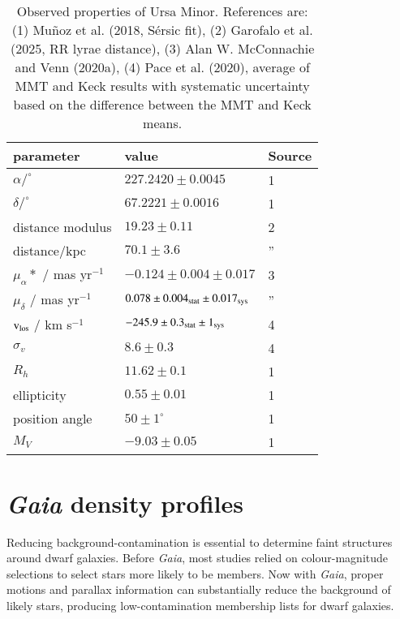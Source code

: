 \documentclass{aa}
\newcommand{\V}{{\rm v}}
\begin{document}
\begin{table}[t]
\centering
\caption[Observed Properties of Ursa Minor]{Observed properties of Ursa Minor. References are: (1) Muñoz et al. (2018, Sérsic fit), (2) Garofalo et al. (2025, RR lyrae distance), (3) Alan W. McConnachie and Venn (2020a), (4) Pace et al. (2020), average of MMT and Keck results with systematic uncertainty based on the difference between the MMT and Keck means. }
\label{tbl:umi_obs_props}
\begin{tabular}{lll}
\hline
parameter & value & Source\\
\hline
$\alpha/^\circ$ & $ 227.2420 \pm 0.0045$ & 1\\
$\delta/^\circ$ & $67.2221 \pm 0.0016$ & 1\\
distance modulus & $19.23 \pm 0.11$ & 2\\
distance/kpc & $70.1 \pm 3.6$ & ”\\
$\mu_\alpha*$ / mas yr$^{-1}$  & $-0.124 \pm 0.004 \pm 0.017$ & 3\\
$\mu_\delta$ / mas yr$^{-1}$  & $0.078 \pm 0.004_{\rm stat} \pm 0.017_{\rm sys}$ & ”\\
$\V_{\rm los}$ / km s$^{-1}$  &$-245.9 \pm 0.3_{\rm stat} \pm 1_{\rm sys}$ & 4\\
$\sigma_v$ & $8.6 \pm 0.3$ & 4\\
$R_h$ & $11.62 \pm 0.1$ & 1\\
ellipticity & $0.55 \pm 0.01$ & 1\\
position angle & $50 \pm 1^\circ$ & 1\\
$M_V$ & $-9.03 \pm 0.05$ & 1\\
\hline
\end{tabular}
\end{table}




\section{{\it Gaia} density profiles}

Reducing background-contamination is essential to determine faint structures around dwarf galaxies. Before {\it Gaia}, most studies relied on colour-magnitude selections to select stars more likely to be members. Now with {\it Gaia}, proper motions and parallax information can substantially reduce the background of likely stars, producing low-contamination membership lists for dwarf galaxies.
\end{document}

